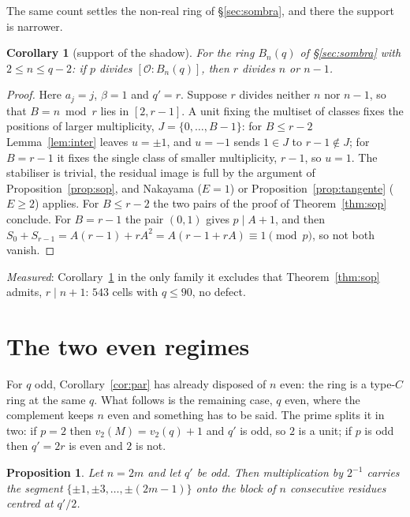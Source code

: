 \documentclass[11pt,a4paper]{article}
\newtheorem{proposition}[theorem]{Proposition}
\newtheorem{corollary}[theorem]{Corollary}
\theoremstyle{definition}
\newcommand{\cO}{\mathcal{O}}
\newcommand{\medido}[1]{\emph{Measured}: #1}
\begin{document}
The same count settles the non-real ring of \S\ref{sec:sombra}, and there the support is narrower.

\begin{corollary}[support of the shadow]\label{cor:sopsombra}
For the ring $B_n(q)$ of \S\ref{sec:sombra} with $2\le n\le q-2$: if $p$ divides $[\cO:B_n(q)]$, then
$r$ divides $n$ or $n-1$.
\end{corollary}

\begin{proof}
Here $a_j=j$, $\beta=1$ and $q'=r$. Suppose $r$ divides neither $n$ nor $n-1$, so that
$B=n\bmod r$ lies in $[2,r-1]$. A unit fixing the multiset of classes fixes the positions of larger
multiplicity, $J=\{0,\dots,B-1\}$: for $B\le r-2$ Lemma~\ref{lem:inter} leaves $u=\pm1$, and $u=-1$
sends $1\in J$ to $r-1\notin J$; for $B=r-1$ it fixes the single class of smaller multiplicity,
$r-1$, so $u=1$. The stabiliser is trivial, the residual image is full by the argument of
Proposition~\ref{prop:sop}, and Nakayama ($E=1$) or Proposition~\ref{prop:tangente} ($E\ge2$)
applies. For $B\le r-2$ the two pairs of the proof of Theorem~\ref{thm:sop} conclude. For $B=r-1$
the pair $(0,1)$ gives $p\mid A+1$, and then
$S_0+S_{r-1}=A(r-1)+rA^2=A(r-1+rA)\equiv1\pmod p$, so not both vanish.
\end{proof}

\medido{Corollary~\ref{cor:sopsombra} in the only family it excludes that Theorem~\ref{thm:sop}
admits, $r\mid n+1$: $543$ cells with $q\le90$, no defect.}

\section{The two even regimes}\label{sec:par}

For $q$ odd, Corollary~\ref{cor:par} has already disposed of $n$ even: the ring is a type-$C$ ring
at the same $q$. What follows is the remaining case, $q$ even, where the complement keeps $n$ even
and something has to be said. The prime splits it in two: if $p=2$ then $v_2(M)=v_2(q)+1$ and $q'$
is odd, so $2$ is a unit; if $p$ is odd then $q'=2r$ is even and $2$ is not.

\begin{proposition}\label{prop:par2}
Let $n=2m$ and let $q'$ be odd. Then multiplication by $2^{-1}$ carries the segment
$\{\pm1,\pm3,\dots,\pm(2m-1)\}$ onto the block of $n$ consecutive residues centred at $q'/2$.
\end{proposition}
\end{document}
